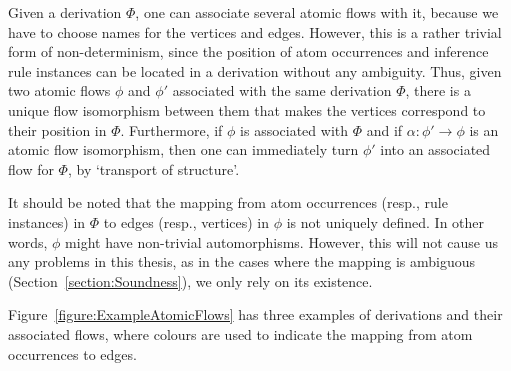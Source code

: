 
\begin{remark}\label{remark:FlowUnique}
Given a derivation $\Phi$, one can associate several atomic flows with it, because we have to choose names for the vertices and edges. However, this is a rather trivial form of non-determinism, since the position of atom occurrences and inference rule instances can be located in a derivation without any ambiguity. Thus, given two atomic flows $\phi$ and $\phi'$ associated with the same derivation $\Phi$, there is a unique flow isomorphism between them that makes the vertices correspond to their position in $\Phi$. Furthermore, if $\phi$ is associated with $\Phi$ and if $\alpha :  \phi' \rightarrow  \phi$ is an atomic flow isomorphism, then one can immediately turn $\phi'$ into an associated flow for $\Phi$, by `transport of structure'.
\end{remark}

\begin{remark}\label{remark:AmbiguousMapping}
It should be noted that the mapping from atom occurrences (resp., rule instances) in $\Phi$ to edges (resp., vertices) in $\phi$ is not uniquely defined. In other words, $\phi$ might have non-trivial automorphisms. However, this will not cause us any problems in this thesis, as in the cases where the mapping is ambiguous (Section~\ref{section:Soundness}), we only rely on its existence.
\end{remark}

\begin{example}
Figure~\vref{figure:ExampleAtomicFlows} has three examples of derivations and their associated flows, where colours are used to indicate the mapping from atom occurrences to edges.
\end{example}


